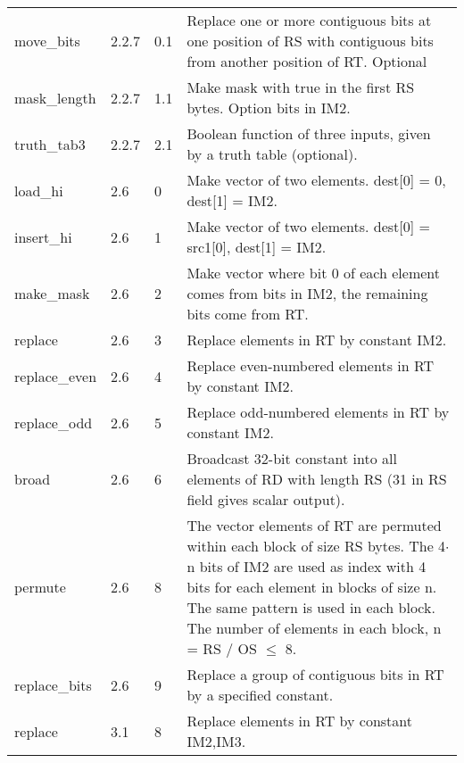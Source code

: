 \documentclass[forwardcom.tex]{subfiles}
\begin{document}
\begin{longtable} {|p{20mm}|p{10mm}|p{8mm}|p{75mm}|}
move\_bits    & 2.2.7 & 0.1 & Replace one or more contiguous bits at one position of RS with contiguous bits from another position of RT. Optional \\

mask\_length  & 2.2.7 & 1.1 & Make mask with true in the first RS bytes. Option bits in IM2. \\

truth\_tab3   & 2.2.7 & 2.1 & Boolean function of three inputs, given by a truth table (optional). \\

load\_hi      & 2.6 & 0 & Make vector of two elements. dest[0] = 0, dest[1] = IM2. \\
insert\_hi    & 2.6 & 1 & Make vector of two elements. dest[0] = src1[0], dest[1] = IM2. \\
make\_mask    & 2.6 & 2 & Make vector where bit 0 of each element comes from bits in IM2, the remaining bits come from RT. \\
replace       & 2.6 & 3 & Replace elements in RT by constant IM2. \\
replace\_even & 2.6 & 4 & Replace even-numbered elements in RT by constant
IM2. \\
replace\_odd  & 2.6 & 5 & Replace odd-numbered elements in RT by constant
IM2. \\
broad         & 2.6 & 6 & Broadcast 32-bit constant into all elements of RD with length RS (31 in RS field gives scalar output). \\
permute       & 2.6 & 8 & The vector elements of RT are permuted within each block of size RS bytes. The 4$\cdot$n bits of IM2 are used as index with 4 bits for
each element in blocks of size n. The same pattern is used in each
block. The number of elements in each block, n = RS / OS $\leq$ 8. \\
replace\_bits & 2.6 &  9  & Replace a group of contiguous bits in RT by a specified constant. \\
replace       & 3.1 & 8 & Replace elements in RT by constant IM2,IM3. \\
\hline
\end{longtable}
\end{document}
